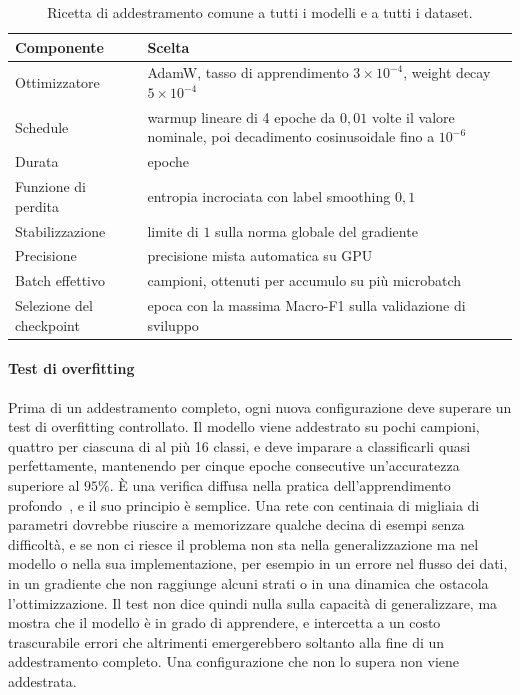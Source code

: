 \begin{table}[t]
\centering
\small
\renewcommand{\arraystretch}{1.2}
\caption[Ricetta di addestramento comune]{Ricetta di addestramento comune a tutti i modelli e a tutti i dataset.}
\label{tab:ricetta_addestramento}
\begin{tabularx}{\textwidth}{@{}>{\raggedright\arraybackslash}p{3.6cm} >{\raggedright\arraybackslash}X@{}}
\hline
\textbf{Componente} & \textbf{Scelta} \\
\hline
Ottimizzatore & AdamW, tasso di apprendimento $3\times10^{-4}$, weight decay $5\times10^{-4}$ \\
Schedule & warmup lineare di 4 epoche da $0{,}01$ volte il valore nominale, poi decadimento cosinusoidale fino a $10^{-6}$ \\
Durata & 128 epoche \\
Funzione di perdita & entropia incrociata con label smoothing $0{,}1$ \\
Stabilizzazione & limite di $1$ sulla norma globale del gradiente \\
Precisione & precisione mista automatica su GPU \\
Batch effettivo & 32 campioni, ottenuti per accumulo su più microbatch \\
Selezione del checkpoint & epoca con la massima Macro-F1 sulla validazione di sviluppo \\
\hline
\end{tabularx}
\end{table}

\paragraph{Test di overfitting}
\label{subsec:verifiche_preliminari}
Prima di un addestramento completo, ogni nuova configurazione deve superare un test di overfitting controllato. Il modello viene addestrato su pochi campioni, quattro per ciascuna di al più 16 classi, e deve imparare a classificarli quasi perfettamente, mantenendo per cinque epoche consecutive un'accuratezza superiore al $95\%$. È una verifica diffusa nella pratica dell'apprendimento profondo~\cite{goodfellow2016deep}, e il suo principio è semplice. Una rete con centinaia di migliaia di parametri dovrebbe riuscire a memorizzare qualche decina di esempi senza difficoltà, e se non ci riesce il problema non sta nella generalizzazione ma nel modello o nella sua implementazione, per esempio in un errore nel flusso dei dati, in un gradiente che non raggiunge alcuni strati o in una dinamica che ostacola l'ottimizzazione. Il test non dice quindi nulla sulla capacità di generalizzare, ma mostra che il modello è in grado di apprendere, e intercetta a un costo trascurabile errori che altrimenti emergerebbero soltanto alla fine di un addestramento completo. Una configurazione che non lo supera non viene addestrata.

